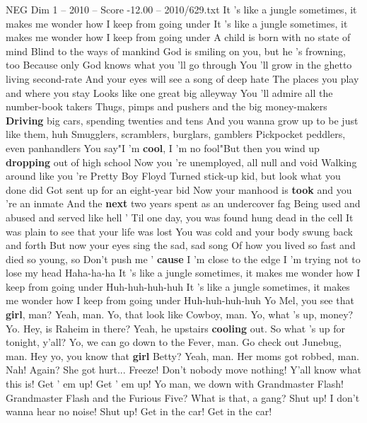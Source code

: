 \begin{textsample}{NEG Dim 1 – 2010 – Score -12.00 – 2010/629.txt}
It 's like a jungle sometimes, it makes me wonder how I keep from going under It 's like a jungle sometimes, it makes me wonder how I keep from going under A child is born with no state of mind Blind to the ways of mankind God is smiling on you, but he 's frowning, too Because only God knows what you 'll go through You 'll grow in the ghetto living second-rate And your eyes will see a song of deep hate The places you play and where you stay Looks like one great big alleyway You 'll admire all the number-book takers Thugs, pimps and pushers and the big money-makers \textbf{Driving} big cars, spending twenties and tens And you wanna grow up to be just like them, huh Smugglers, scramblers, burglars, gamblers Pickpocket peddlers, even panhandlers You say"I 'm \textbf{cool}, I 'm no fool"But then you wind up \textbf{dropping} out of high school Now you 're unemployed, all null and void Walking around like you 're Pretty Boy Floyd Turned stick-up kid, but look what you done did Got sent up for an eight-year bid Now your manhood is \textbf{took} and you 're an inmate And the \textbf{next} two years spent as an undercover fag Being used and abused and served like hell ' Til one day, you was found hung dead in the cell It was plain to see that your life was lost You was cold and your body swung back and forth But now your eyes sing the sad, sad song Of how you lived so fast and died so young, so Don't push me ' \textbf{cause} I 'm close to the edge I 'm trying not to lose my head Haha-ha-ha It 's like a jungle sometimes, it makes me wonder how I keep from going under Huh-huh-huh-huh It 's like a jungle sometimes, it makes me wonder how I keep from going under Huh-huh-huh-huh Yo Mel, you see that \textbf{girl}, man?
Yeah, man.
Yo, that look like Cowboy, man.
Yo, what 's up, money?
Yo.
Hey, is Raheim in there?
Yeah, he upstairs \textbf{cooling} out.
So what 's up for tonight, y'all?
Yo, we can go down to the Fever, man.
Go check out Junebug, man.
Hey yo, you know that \textbf{girl} Betty?
Yeah, man.
Her moms got robbed, man.
Nah!
Again?
She got hurt...
Freeze!
Don't nobody move nothing!
Y'all know what this is!
Get ' em up!
Get ' em up!
Yo man, we down with Grandmaster Flash!
Grandmaster Flash and the Furious Five?
What is that, a gang?
Shut up!
I don't wanna hear no noise!
Shut up!
Get in the car!
Get in the car!

\end{textsample}

